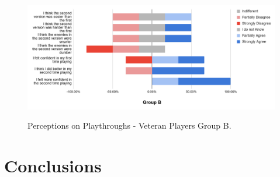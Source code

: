 \begin{figure}[!ht]
    \begin{center}
    \caption{Perceptions on Playthroughs - Veteran Players Group B.}
        \includegraphics[width=36em]{figures/fig-perception-versions-veteran-players-group-b.png}
        \label{fig:perception-playthrough-veteran-players-group-b}
    \end{center}
\end{figure}


\section{Conclusions}




